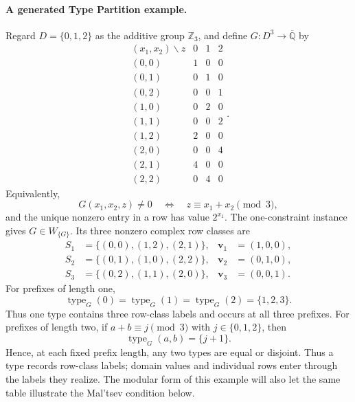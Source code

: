 \documentclass[11pt]{article}
\theoremstyle{plain}
\theoremstyle{definition}
\theoremstyle{remark}
\newcommand{\AlgNums}{\overline{\mathbb Q}}
\DeclareMathOperator{\typeop}{type}
\begin{document}
\paragraph{A generated Type Partition example.}
Regard $D=\{0,1,2\}$ as the additive group $\mathbb Z_3$, and define
$G:D^3\to\AlgNums$ by
\[
\begin{array}{c|rrr}
  (x_1,x_2)\backslash z&0&1&2\\ \hline
  (0,0)&1&0&0\\
  (0,1)&0&1&0\\
  (0,2)&0&0&1\\
  (1,0)&0&2&0\\
  (1,1)&0&0&2\\
  (1,2)&2&0&0\\
  (2,0)&0&0&4\\
  (2,1)&4&0&0\\
  (2,2)&0&4&0
\end{array}.
\]
Equivalently,
\begin{equation}
  G(x_1,x_2,z)\ne0
  \quad\Longleftrightarrow\quad
  z\equiv x_1+x_2\pmod 3,
  \label{eq:type-example-modular-support}
\end{equation}
and the unique nonzero entry in a row has value $2^{x_1}$.
The one-constraint instance gives $G\in W_{\{G\}}$.  Its three nonzero
complex row classes are
\[
\begin{aligned}
  S_1&=\{(0,0),(1,2),(2,1)\},& \mathbf v_1&=(1,0,0),\\
  S_2&=\{(0,1),(1,0),(2,2)\},& \mathbf v_2&=(0,1,0),\\
  S_3&=\{(0,2),(1,1),(2,0)\},& \mathbf v_3&=(0,0,1).
\end{aligned}
\]
For prefixes of length one,
\[
  \typeop_G(0)=\typeop_G(1)=\typeop_G(2)=\{1,2,3\}.
\]
Thus one type contains three row-class labels and occurs at all three
prefixes.  For prefixes of length two, if $a+b\equiv j\pmod3$ with
$j\in\{0,1,2\}$, then
\[
  \typeop_G(a,b)=\{j+1\}.
\]
Hence, at each fixed prefix length, any two types are equal or disjoint.
Thus a type records row-class labels; domain values and individual rows enter
through the labels they realize.  The modular form of this example will also let
the same table illustrate the Mal'tsev condition below.
\end{document}
